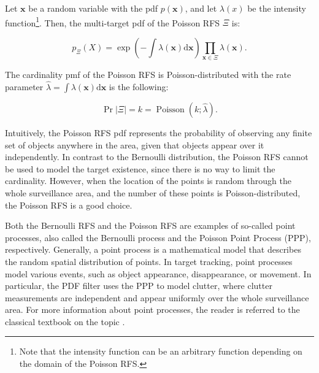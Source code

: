 \begin{definition}
    Let $\mathbf{x}$ be a random variable with the pdf $p(\mathbf{x})$, and let $\lambda(x)$ be the intensity function\footnote{Note that the intensity function can be an arbitrary function depending on the domain of the Poisson RFS.}. Then, the multi-target pdf of the Poisson RFS $\Xi$ is:

    \begin{equation}\label{eq:poisson-rfs-pdf}
        p_\Xi(X) = \exp\left(-\int \lambda(\mathbf{x}) \mathrm{d}\mathbf{x}\right)
        \prod_{\mathbf{x} \in \Xi} \lambda(\mathbf{x}).
    \end{equation}

    The cardinality pmf of the Poisson RFS is Poisson-distributed with the rate parameter $\hat{\lambda} = \int \lambda(\mathbf{x}) \mathrm{d}\mathbf{x}$ is the following:

    \begin{equation}
        \Pr{|\Xi| = k} = \operatorname{Poisson}(k; \hat{\lambda}).
    \end{equation}
\end{definition}

Intuitively, the Poisson RFS pdf represents the probability of observing any finite set of objects anywhere in the area, given that objects appear over it independently. In contrast to the Bernoulli distribution, the Poisson RFS cannot be used to model the target existence, since there is no way to limit the cardinality. However, when the location of the points is random through the whole surveillance area, and the number of these points is Poisson-distributed, the Poisson RFS is a good choice.

Both the Bernoulli RFS and the Poisson RFS are examples of so-called point processes, also called the Bernoulli process and the Poisson Point Process (PPP), respectively. Generally, a point process is a mathematical model that describes the random spatial distribution of points. In target tracking, point processes model various events, such as object appearance, disappearance, or movement. In particular, the PDF filter uses the PPP to model clutter, where clutter measurements are independent and appear uniformly over the whole surveillance area. For more information about point processes, the reader is referred to the classical textbook on the topic \cite{streitPoissonPointProcesses2010}.
